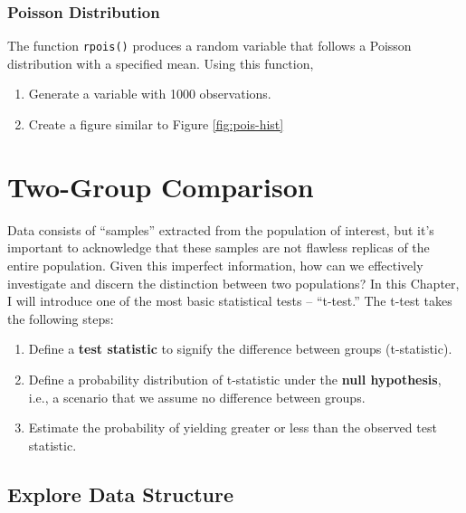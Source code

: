 \documentclass[
]{article}
\providecommand{\tightlist}{%
  \setlength{\itemsep}{0pt}\setlength{\parskip}{0pt}}
\begin{document}
\hypertarget{poisson-distribution}{%
\subsubsection{Poisson Distribution}\label{poisson-distribution}}

The function \texttt{rpois()} produces a random variable that follows a Poisson distribution with a specified mean. Using this function,

\begin{enumerate}
\def\labelenumi{\arabic{enumi}.}
\tightlist
\item
  Generate a variable with 1000 observations.
\item
  Create a figure similar to Figure \ref{fig:pois-hist}
\end{enumerate}

\hypertarget{two-group-comparison}{%
\section{Two-Group Comparison}\label{two-group-comparison}}

Data consists of ``samples'' extracted from the population of interest, but it's important to acknowledge that these samples are not flawless replicas of the entire population. Given this imperfect information, how can we effectively investigate and discern the distinction between two populations? In this Chapter, I will introduce one of the most basic statistical tests -- ``t-test.'' The t-test takes the following steps:

\begin{enumerate}
\def\labelenumi{\arabic{enumi}.}
\tightlist
\item
  Define a \textbf{test statistic} to signify the difference between groups (t-statistic).
\item
  Define a probability distribution of t-statistic under the \textbf{null hypothesis}, i.e., a scenario that we assume no difference between groups.
\item
  Estimate the probability of yielding greater or less than the observed test statistic.
\end{enumerate}

\hypertarget{explore-data-structure}{%
\subsection{Explore Data Structure}\label{explore-data-structure}}
\end{document}
